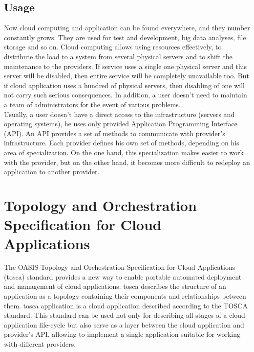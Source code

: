 \subsection*{Usage}
Now cloud computing and application can be found everywhere, and they number constantly grows. \cite*{cloud_stat}
They are used for test and development, big data analyses, file storage and so on.
Cloud computing allows using resources effectively, to distribute the load to a system from several physical servers and to shift the maintenance to the providers. 
If service uses a single one physical server and this server will be disabled, then entire service will be completely unavailable too.
But if cloud application uses a hundred of physical servers, then disabling of one will not carry such serious consequences.
In addition, a user doesn't need to maintain a team of administrators for the event of various problems.\\
Usually, a user doesn't have a direct access to the infrastructure (servers and operating systems), he uses only provided Application Programming Interface (API).
An API provides a set of methods to communicate with provider's infrastructure. 
Each provider defines his own set of methods, depending on his area of specialization. 
On the one hand, this specialization makes easier to work with the provider, but on the other hand, it becomes more difficult to redeploy an application to another provider.

\section{Topology and Orchestration Specification for Cloud	Applications} \label{sec:tosca}
The OASIS \cite{oasis} Topology and Orchestration Specification for Cloud Applications (\gls{tosca}) standard provides a new way to enable portable automated deployment and management of cloud applications.
\gls{tosca} describes the structure of an application as a topology containing their components and relationships between them.
\gls{tosca} application is a cloud application described according to the TOSCA standard.
This standard can be used not only for describing all stages of a cloud application life-cycle but also serve as a layer between the cloud application and provider's API, allowing to implement a single application suitable for working with different providers. 
